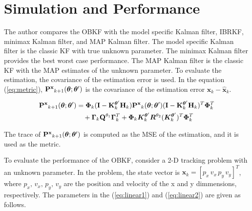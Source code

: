 \section{Simulation and Performance}\label{sec:performance}

The author compares the OBKF with the model specific Kalman filter, IBRKF, minimax Kalman filter, and MAP Kalman filter. The model specific Kalman filter is the classic KF with true unknown parameter. The minimax Kalman filter provides the best worst case performance. The MAP Kalman filter is the classic KF with the MAP estimates of the unknown parameter. 
To evaluate the estimation, the covariance of the estimation error is used. In the equation (\ref{eq:metric}), ${\bf P^x}_{k+1}(\bm{\theta};\bm{\theta}')$ is the covariance of the estimation error $\bm{x}_k-\bm{\hat x}_k$. 

\begin{align}\label{eq:metric}
{\bf P^x}_{k+1}(\bm{\theta};\bm{\theta}') &= \bm{\Phi}_k({\bf I}-{\bf K}^{\bm{\theta}'}_k{\bf H}_k){\bf P^x}_k(\bm{\theta};\bm{\theta}')({\bf I}-{\bf K}^{\bm{\theta}'}_k{\bf H}_k)^T\bm{\Phi}^T_k \nonumber \\
&\quad + \bm{\Gamma}_k{\bf Q}^{\theta_1}\bm{\Gamma}_k^T + \bm{\Phi}_k\bm{K}_k^{\bm{\theta}'}\bm{R}^{\theta_2}(\bm{K}_k^{\bm{\theta}'})^T\bm{\Phi}_k^T
\end{align}

The trace of ${\bf P^x}_{k+1}(\bm{\theta};\bm{\theta}')$ is computed as the MSE of the estimation, and it is used as the metric.

To evaluate the performance of the OBKF, consider a 2-D tracking problem with an unknown parameter. In the problem, the state vector is $\bm{x}_k=[p_x\, v_x\, p_y\, v_y]^T$, where $p_x,\, v_x,\, p_y,\, v_y$ are the position and velocity of the x and y dimmensions, respectively. The parameters in the (\ref{eq:linear1}) and (\ref{eq:linear2}) are given as follows.

